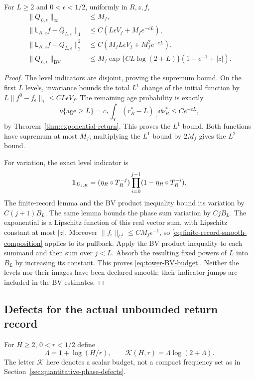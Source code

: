 \begin{proposition}
\label{prop:tower-bv-approximation}
For $L\ge2$ and $0<\epsilon<1/2$, uniformly in $R,z,f$,
\begin{align}
 \|Q_{L,\epsilon}\|_\infty&\le M_f,
                                      \label{eq:tower-sup-bound}\\
 \|\mathsf L_{R,z}f-Q_{L,\epsilon}\|_1
        &\le C(L\epsilon V_f+M_fe^{-cL}),
                                      \label{eq:tower-L1-approximation}\\
 \|\mathsf L_{R,z}f-Q_{L,\epsilon}\|_2^2
        &\le C(M_fL\epsilon V_f+M_f^2e^{-cL}),
                                      \label{eq:tower-L2-approximation}\\
 \|Q_{L,\epsilon}\|_{\mathrm{BV}}
        &\le M_f\exp\{C L\log(2+L)\}(1+\epsilon^{-1}+|z|).
                                      \label{eq:tower-BV-budget}
\end{align}
\end{proposition}
\begin{proof}
The level indicators are disjoint, proving the supremum bound.
On the first $L$ levels, invariance bounds the total $L^1$ change
of the initial function by
$L\|f^0-f_\epsilon\|_1\le CL\epsilon V_f$.
The remaining age probability is exactly
\[
 \nu\{\text{age}\ge L\}
       =c_*\int_Y(r_R^*-L)_+\dd\nu_R^*\le Ce^{-cL},
\]
by Theorem~\ref{thm:exponential-return}. This proves the $L^1$
bound. Both functions have supremum at most $M_f$; multiplying the
$L^1$ bound by $2M_f$ gives the $L^2$ bound.

For variation, the exact level indicator is
\[
 \mathbf1_{D_{j,R}}=(\eta_R\circ T_R^{-j})
                    \prod_{i=0}^{j-1}(1-\eta_R\circ T_R^{-i}).
\]
The finite-record lemma and the BV product inequality bound its
variation by $C(j+1)B_L$. The same lemma bounds the phase sum
variation by $CjB_L$. The exponential is a Lipschitz function of this
real vector sum, with Lipschitz constant at most $|z|$.
Moreover $\|f_\epsilon\|_{C^1}\le C M_f\epsilon^{-1}$, so
\eqref{eq:finite-record-smooth-composition} applies to its pullback.
Apply the BV product inequality to each summand and then sum over
$j<L$. Absorb the resulting fixed powers of $L$ into $B_L$ by
increasing its constant. This proves \eqref{eq:tower-BV-budget}.
Neither the levels nor their images have been declared smooth; their
indicator jumps are included in the BV estimates.
\end{proof}

\subsection{Defects for the actual unbounded return record}
For $H\ge2$, $0<r<1/2$ define
\begin{equation}\label{eq:return-log-budget}
 \Lambda=1+\log(H/r),\qquad \mathcal K(H,r)=\Lambda\log(2+\Lambda).
\end{equation}
The letter $\mathcal K$ here denotes a scalar budget, not a compact
frequency set as in Section~\ref{sec:quantitative-phase-defects}.

